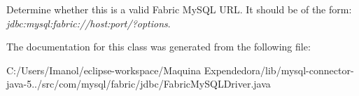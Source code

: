 Determine whether this is a valid Fabric My\+S\+QL U\+RL. It should be of the form\+: {\itshape jdbc\+:mysql\+:fabric\+://host\+:port/?options}. 

The documentation for this class was generated from the following file\+:\begin{DoxyCompactItemize}
\item 
C\+:/\+Users/\+Imanol/eclipse-\/workspace/\+Maquina Expendedora/lib/mysql-\/connector-\/java-\/5../src/com/mysql/fabric/jdbc/Fabric\+My\+S\+Q\+L\+Driver.\+java\end{DoxyCompactItemize}

